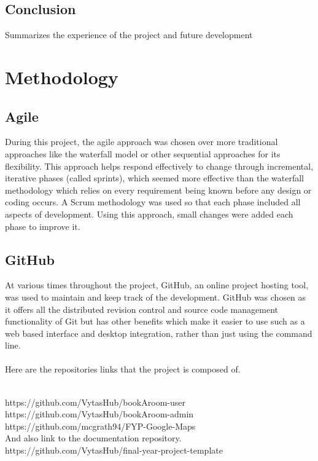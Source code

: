 \begin{itemize}
\section{Conclusion}
Summarizes the experience of the project and future development




\chapter{Methodology}


\section{Agile}

During this project, the agile approach was chosen over more traditional approaches like the waterfall model or other sequential approaches for its flexibility. This approach helps respond effectively to change through incremental, iterative phases (called sprints), which seemed more effective than the waterfall methodology which relies on every requirement being known before any design or coding occurs. A Scrum methodology was used so that each phase included all aspects of development. Using this approach, small changes were added each phase to improve it.

\section{GitHub}

At various times throughout the project, GitHub, an online project hosting tool, was used to maintain and keep track of the development. GitHub was chosen as it offers all the distributed revision control and source code management functionality of Git but has other benefits which make it easier to use such as a web based interface and desktop integration, rather than just using the command line. 
\\
\\Here are the repositories links that the project is composed of. 

\\https://github.com/VytasHub/bookAroom-user
\\https://github.com/VytasHub/bookAroom-admin
\\https://github.com/mcgrath94/FYP-Google-Maps
\\And also link to the documentation repository.
\\https://github.com/VytasHub/final-year-project-template




\end{itemize}
